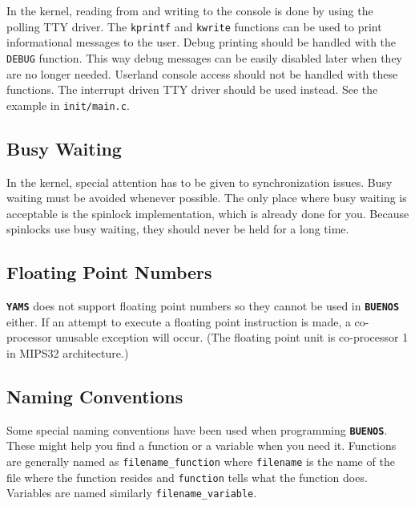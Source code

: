 \documentclass[twoside,a4paper]{report}
\newcommand{\buenos}{\texttt{\textbf{BUENOS}}}
\newcommand{\yams}{\texttt{\textbf{YAMS}}}
\begin{document}

In the kernel, reading from and writing to the console is done by
using the polling TTY driver. The \texttt{kprintf} and \texttt{kwrite}
functions can be used to print informational messages to the user.
Debug printing should be handled with the \texttt{DEBUG} function.
This way debug messages can be easily disabled later when
they are no longer needed. Userland console access should not be
handled with these functions. The interrupt driven TTY driver should
be used instead. See the example in \texttt{init/main.c}.

\subsection{Busy Waiting}


In the kernel, special attention has to be given to synchronization
issues.  Busy waiting must be avoided whenever possible. The only
place where busy waiting is acceptable is the spinlock
implementation, which is already done for you. Because spinlocks use
busy waiting, they should never be held for a long time.

\subsection{Floating Point Numbers}


\yams{} does not support floating point numbers so they cannot be used
in \buenos{} either. If an attempt to execute a floating point
instruction is made, a co-processor unusable exception will occur.
(The floating point unit is co-processor 1 in MIPS32 architecture.)

\subsection{Naming Conventions}


Some special naming conventions have been used when programming
\buenos{}.  These might help you find a function or a variable when
you need it. Functions are generally named as
\texttt{filename\_function} where \texttt{filename} is the name of the
file where the function resides and \texttt{function} tells what the
function does. Variables are named similarly
\texttt{filename\_variable}.
\end{document}
